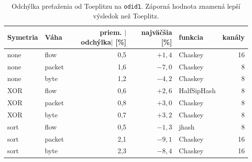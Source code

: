 \begin{table}[ht]
  \centering
  \small
  \caption{Odchýlka preťaženia od Toeplitzu na \texttt{odid1}. Záporná hodnota znamená lepší výsledok než Toeplitz.}
  \label{tab:hashe-odchylky}
  \begin{tabular}{l l r r l r}
    \toprule
    Symetria & Váha & priem. $|$odchýlka$|$ [\%] & najväčšia [\%] & funkcia & kanály \\
    \midrule
    none & flow & 0,5 & $+1{,}4$ & Chaskey & 16 \\
    none & packet & 1,6 & $-7{,}0$ & Chaskey & 8 \\
    none & byte & 1,2 & $-4{,}2$ & Chaskey & 8 \\
    \midrule
    XOR & flow & 0,6 & $+2{,}6$ & HalfSipHash & 8 \\
    XOR & packet & 0,8 & $+3{,}0$ & Chaskey & 8 \\
    XOR & byte & 0,7 & $+3{,}2$ & Chaskey & 8 \\
    \midrule
    sort & flow & 0,5 & $-1{,}3$ & jhash & 8 \\
    sort & packet & 2,1 & $-9{,}1$ & Chaskey & 16 \\
    sort & byte & 2,3 & $-8{,}4$ & Chaskey & 16 \\
    \bottomrule
  \end{tabular}
\end{table}
